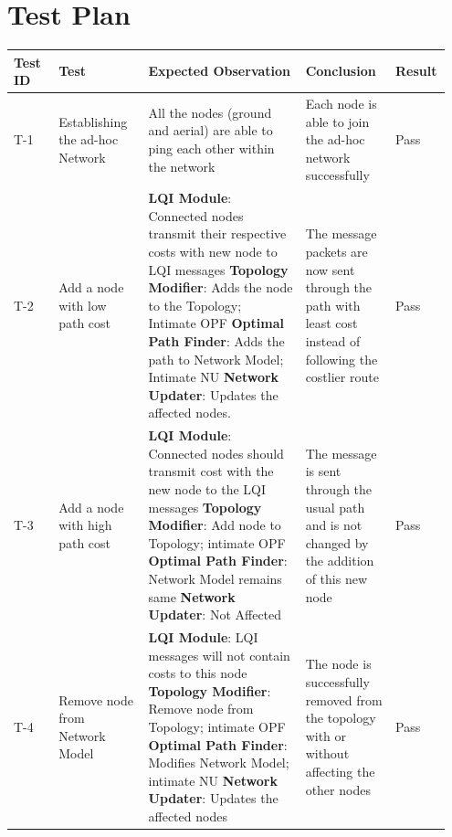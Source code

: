 \documentclass{article}
\begin{document}
\section{Test Plan}
{\renewcommand{\arraystretch}{1.5}
\begin{longtable}{  | p{0.1\linewidth} | p{0.2\linewidth} | p{0.35\linewidth} | p{0.2\linewidth} | p{0.1\linewidth} | }
\hline
\textbf{Test ID} & \textbf{Test} & \textbf{Expected Observation} & \textbf{Conclusion} & \textbf{Result} \\ 
\hline \hline
T-1 & Establishing the ad-hoc Network & All the nodes (ground and aerial) are able to ping each other within the network
& Each node is able to join the ad-hoc network successfully & Pass \\
\hline
T-2 & 
Add a node with low path cost & 
\textbf{LQI Module}: Connected nodes transmit their respective costs with new node to LQI messages \newline 
\textbf{Topology Modifier}: Adds the node to the Topology; Intimate OPF \newline 
\textbf{Optimal Path Finder}: Adds the path to Network Model; Intimate NU \newline
\textbf{Network Updater}: Updates the affected nodes. &
The message packets are now sent through the path with least cost instead of following the costlier route &
Pass \\
\hline
T-3 & 
Add a node with high path cost & 
\textbf{LQI Module}: Connected nodes should transmit cost with the new node to the LQI messages\newline 
\textbf{Topology Modifier}: Add node to Topology; intimate OPF\newline 
\textbf{Optimal Path Finder}: Network Model remains same\newline
\textbf{Network Updater}: Not Affected &
The message is sent through the usual path and is not changed by the addition of this new node &
Pass\\
\hline
T-4 & 
Remove node from Network Model & 
\textbf{LQI Module}: LQI messages will not contain costs to this node\newline 
\textbf{Topology Modifier}: Remove node from Topology; intimate OPF \newline 
\textbf{Optimal Path Finder}: Modifies Network Model; intimate NU \newline
\textbf{Network Updater}: Updates the affected nodes &
The node is successfully removed from the topology with or without affecting the other nodes &
Pass\\

\end{longtable}}
\end{document}
